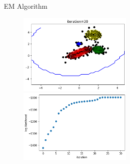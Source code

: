 \documentclass[
ngerman,
]{tudaexercise}
\begin{document}
\begin{task}{EM Algorithm}
\begin{subtask}
\begin{figure}[H]
	\includegraphics[width=0.5\textwidth]{i5}
	\includegraphics[width=0.5\textwidth]{ilog}
\end{figure}
\end{subtask}
\end{task}
	
\end{document}
